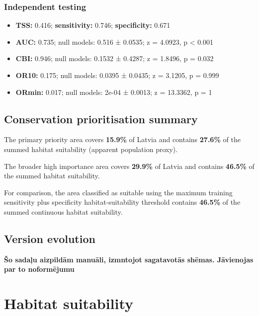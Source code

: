 \documentclass[
  openany]{book}
\providecommand{\tightlist}{%
  \setlength{\itemsep}{0pt}\setlength{\parskip}{0pt}}
\providecommand{\tightlist}{%
  \setlength{\itemsep}{0pt}%
  \setlength{\parskip}{0pt}%
}
\begin{document}
\subsubsection*{Independent testing}\label{independent-testing-20}

\begin{itemize}
\tightlist
\item
  \textbf{TSS:} 0.416; \textbf{sensitivity:} 0.746; \textbf{specificity:} 0.671
\item
  \textbf{AUC:} 0.735; null models: 0.516 ± 0.0535; z = 4.0923, p \textless{} 0.001
\item
  \textbf{CBI:} 0.946; null models: 0.1532 ± 0.4287; z = 1.8496, p = 0.032
\item
  \textbf{OR10:} 0.175; null models: 0.0395 ± 0.0435; z = 3.1205, p = 0.999
\item
  \textbf{ORmin:} 0.017; null models: 2e-04 ± 0.0013; z = 13.3362, p = 1
\end{itemize}

\subsection*{Conservation prioritisation summary}\label{conservation-prioritisation-summary-20}

The primary priority area covers \textbf{15.9\%} of Latvia and contains \textbf{27.6\%} of the summed habitat suitability (apparent population proxy).

The broader high importance area covers \textbf{29.9\%} of Latvia and contains \textbf{46.5\%} of the summed habitat suitability.

For comparison, the area classified as suitable using the maximum training sensitivity plus specificity habitat-suitability threshold contains \textbf{46.5\%} of the summed continuous habitat suitability.

\subsection*{Version evolution}\label{version-evolution-20}

\textbf{Šo sadaļu aizpildām manuāli, izmntojot sagatavotās shēmas. Jāvienojas par to noformējumu}

\section*{Habitat suitability}\label{habitat-suitability-20}
\end{document}
